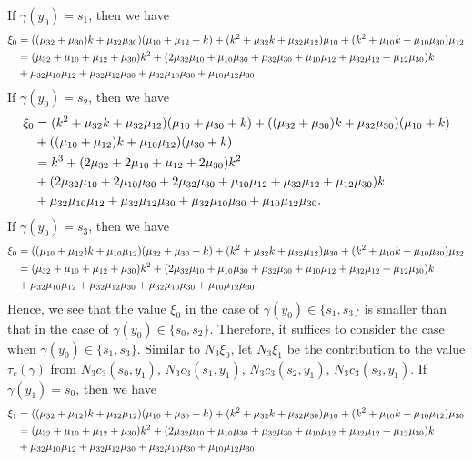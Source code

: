 \documentclass[11pt]{article}
\theoremstyle{definition}
\begin{document}
If $\gamma(y_0)=s_1$, then we have
\begin{align}
    \xi_0&=((\mu_{32}+\mu_{30})k+\mu_{32}\mu_{30})(\mu_{10}+\mu_{12}+k)+(k^2+\mu_{32}k+\mu_{32}\mu_{12})\mu_{10}+(k^2+\mu_{10}k+\mu_{10}\mu_{30})\mu_{12}\notag\\
    &=(\mu_{32}+\mu_{10}+\mu_{12}+\mu_{30})k^2+(2\mu_{32}\mu_{10}+\mu_{10}\mu_{30}+\mu_{32}\mu_{30}+\mu_{10}\mu_{12}+\mu_{32}\mu_{12}+\mu_{12}\mu_{30})k\notag\\
    &+\mu_{32}\mu_{10}\mu_{12}+\mu_{32}\mu_{12}\mu_{30}+\mu_{32}\mu_{10}\mu_{30}+\mu_{10}\mu_{12}\mu_{30}.
\end{align}
If $\gamma(y_0)=s_2$, then we have
\begin{align}
    \xi_0&=(k^2+\mu_{32}k+\mu_{32}\mu_{12})(\mu_{10}+\mu_{30}+k)+((\mu_{32}+\mu_{30})k+\mu_{32}\mu_{30})(\mu_{10}+k)\notag\\&+((\mu_{10}+\mu_{12})k+\mu_{10}\mu_{12})(\mu_{30}+k)\notag\\
    &=k^3+(2\mu_{32}+2\mu_{10}+\mu_{12}+2\mu_{30})k^2\notag\\
    &+(2\mu_{32}\mu_{10}+2\mu_{10}\mu_{30}+2\mu_{32}\mu_{30}+\mu_{10}\mu_{12}+\mu_{32}\mu_{12}+\mu_{12}\mu_{30})k\notag\\
    &+\mu_{32}\mu_{10}\mu_{12}+\mu_{32}\mu_{12}\mu_{30}+\mu_{32}\mu_{10}\mu_{30}+\mu_{10}\mu_{12}\mu_{30}.
\end{align}
If $\gamma(y_0)=s_3$, then we have
\begin{align}
    \xi_0&=((\mu_{10}+\mu_{12})k+\mu_{10}\mu_{12})(\mu_{32}+\mu_{30}+k)+(k^2+\mu_{32}k+\mu_{32}\mu_{12})\mu_{30}+(k^2+\mu_{10}k+\mu_{10}\mu_{30})\mu_{32}\notag\\
    &=(\mu_{32}+\mu_{10}+\mu_{12}+\mu_{30})k^2+(2\mu_{32}\mu_{10}+\mu_{10}\mu_{30}+\mu_{32}\mu_{30}+\mu_{10}\mu_{12}+\mu_{32}\mu_{12}+\mu_{12}\mu_{30})k\notag\\
    &+\mu_{32}\mu_{10}\mu_{12}+\mu_{32}\mu_{12}\mu_{30}+\mu_{32}\mu_{10}\mu_{30}+\mu_{10}\mu_{12}\mu_{30}.
\end{align}
Hence, we see that the value $\xi_0$ in the case of $\gamma(y_0)\in \{s_1,s_3\}$ is smaller than that in the case of $\gamma(y_0)\in \{s_0,s_2\}$. Therefore, it suffices to consider the case when $\gamma(y_0)\in \{s_1,s_3\}$. Similar to $N_3\xi_0$, let $N_3\xi_1$ be the contribution to the value $\tau_{c}(\gamma)$ from $N_3c_3(s_0,y_1)$, $N_3c_3(s_1,y_1)$, $N_3c_3(s_2,y_1)$, $N_3c_3(s_3,y_1)$. If $\gamma(y_1)=s_0$, then we have
\begin{align}
    \xi_1&=((\mu_{32}+\mu_{12})k+\mu_{32}\mu_{12})(\mu_{10}+\mu_{30}+k)+(k^2+\mu_{32}k+\mu_{32}\mu_{30})\mu_{10}+(k^2+\mu_{10}k+\mu_{10}\mu_{12})\mu_{30}\notag\\
    &=(\mu_{32}+\mu_{10}+\mu_{12}+\mu_{30})k^2+(2\mu_{32}\mu_{10}+\mu_{10}\mu_{30}+\mu_{32}\mu_{30}+\mu_{10}\mu_{12}+\mu_{32}\mu_{12}+\mu_{12}\mu_{30})k\notag\\&+\mu_{32}\mu_{10}\mu_{12}+\mu_{32}\mu_{12}\mu_{30}+\mu_{32}\mu_{10}\mu_{30}+\mu_{10}\mu_{12}\mu_{30}.
\end{align}
\end{document}
